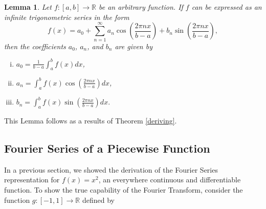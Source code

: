 \documentclass[11pt]{amsart}
\theoremstyle{plain}
\newtheorem{lemma}[theorem]{Lemma}
\theoremstyle{definition}
\newcommand{\R}{\mathbb R}
\begin{document}
    \begin{lemma}\label{lem:bounds}
        Let $f:[a,b]\to\R$ be an arbitrary function. If $f$ can be expressed as an infinite trigonometric series in the form 
        \begin{equation}
            \label{eqn:fourier2}
            f(x) = a_0 + \sum_{n=1}^\infty a_n\cos\left(\dfrac{2\pi nx}{b-a}\right) + b_n\sin\left(\dfrac{2\pi nx}{b-a}\right),
            \end{equation}
        then the coefficients  $a_0$, $a_n$, and $b_n$ are given by
        \begin{enumerate}[(i)]
            \item $a_0=\frac{1}{b-a}\int_{a}^{b}f(x)dx$,
            \item $a_n=\int_{a}^{b}f(x)\cos\left(\frac{2\pi nx}{b-a}\right)dx$,
            \item $b_n=\int_{a}^{b}f(x)\sin\left(\frac{2\pi nx}{b-a}\right)dx.$
        \end{enumerate}
    \end{lemma}
This Lemma follows as a results of Theorem \ref{deriving}.
\subsection{Fourier Series of a Piecewise Function}\label{sawtooth}
In a previous section, we showed the derivation of the Fourier Series representation for $f(x)=x^2$, an everywhere continuous and differentiable function. To show the true capability of the Fourier Transform, consider the function $g:[-1,1]\to\R$ defined by
\end{document}
